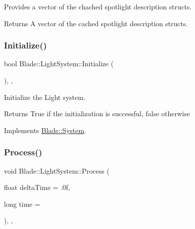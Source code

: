 Provides a vector of the chached spotlight description structs. 

\begin{DoxyReturn}{Returns}
A vector of the cached spotlight description structs. 
\end{DoxyReturn}
\mbox{\label{class_blade_1_1_light_system_af87b68ecd946b49576a17e59bfc88934}} 
\subsubsection{\texorpdfstring{Initialize()}{Initialize()}}
{\footnotesize\ttfamily bool Blade\+::\+Light\+System\+::\+Initialize (\begin{DoxyParamCaption}{ }\end{DoxyParamCaption})\hspace{0.3cm}{\ttfamily [override]}, {\ttfamily [virtual]}, {\ttfamily [noexcept]}}



Initialize the Light system. 

\begin{DoxyReturn}{Returns}
True if the initialization is successful, false otherwise 
\end{DoxyReturn}


Implements \hyperlink{class_blade_1_1_system_a63fa00af40dc54d093300eff4785f26f}{Blade\+::\+System}.

\mbox{\label{class_blade_1_1_light_system_afbad47302dca40e57322a68252cb08e7}} 
\subsubsection{\texorpdfstring{Process()}{Process()}}
{\footnotesize\ttfamily void Blade\+::\+Light\+System\+::\+Process (\begin{DoxyParamCaption}\item[{float}]{delta\+Time = {\ttfamily .0f},  }\item[{long}]{time = {} }\end{DoxyParamCaption})\hspace{0.3cm}{\ttfamily [override]}, {\ttfamily [virtual]}, {\ttfamily [noexcept]}}



